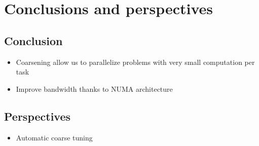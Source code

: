 \documentclass[oneside,12t]{classes/Thesis}
\begin{document}
\chapter{Conclusions and perspectives}
\minitoc
\vspace{1cm}
\section{Conclusion}
  \begin{itemize}
    \item Coarsening allow us to parallelize problems with very small computation per task
    \item Improve bandwidth thanks to NUMA architecture
  \end{itemize}


\section{Perspectives}
  \begin{itemize}
    \item Automatic coarse tuning
  \end{itemize}



\backmatter %
%
\appendix



\end{document}
